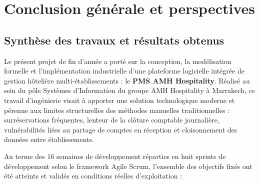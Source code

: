 \chapter*{Conclusion générale et perspectives}

\section*{Synthèse des travaux et résultats obtenus}

Le présent projet de fin d'année a porté sur la conception, la modélisation formelle et l'implémentation industrielle d'une plateforme logicielle intégrée de gestion hôtelière multi-établissements : le \textbf{PMS AMH Hospitality}. Réalisé au sein du pôle Systèmes d'Information du groupe AMH Hospitality à Marrakech, ce travail d'ingénierie visait à apporter une solution technologique moderne et pérenne aux limites structurelles des méthodes manuelles traditionnelles : surréservations fréquentes, lenteur de la clôture comptable journalière, vulnérabilités liées au partage de comptes en réception et cloisonnement des données entre établissements.

Au terme des 16 semaines de développement réparties en huit sprints de développement selon le framework Agile Scrum, l'ensemble des objectifs fixés ont été atteints et validés en conditions réelles d'exploitation :

